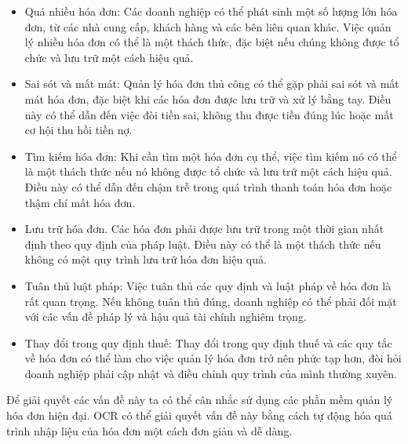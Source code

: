 \begin{itemize}
    \item Quá nhiều hóa đơn: Các doanh nghiệp có thể phát sinh một số lượng lớn hóa đơn, từ các nhà cung cấp, khách hàng và các bên liên quan khác. Việc quản lý nhiều hóa đơn có thể là một thách thức, đặc biệt nếu chúng không được tổ chức và lưu trữ một cách hiệu quả.
    \item Sai sót và mất mát: Quản lý hóa đơn thủ công có thể gặp phải sai sót và mất mát hóa đơn, đặc biệt khi các hóa đơn được lưu trữ và xử lý bằng tay. Điều này có thể dẫn đến việc đòi tiền sai, không thu được tiền đúng lúc hoặc mất cơ hội thu hồi tiền nợ. 
    \item Tìm kiếm hóa đơn: Khi cần tìm một hóa đơn cụ thể, việc tìm kiếm nó có thể là một thách thức nếu nó không được tổ chức và lưu trữ một cách hiệu quả. Điều này có thể dẫn đến chậm trễ trong quá trình thanh toán hóa đơn hoặc thậm chí mất hóa đơn.
    \item Lưu trữ hóa đơn. Các hóa đơn phải được lưu trữ trong một thời gian nhất định theo quy định của pháp luật. Điều này có thể là một thách thức nếu không có một quy trình lưu trữ hóa đơn hiệu quả.
    \item Tuân thủ luật pháp: Việc tuân thủ các quy định và luật pháp về hóa đơn là rất quan trọng. Nếu không tuân thủ đúng, doanh nghiệp có thể phải đối mặt với các vấn đề pháp lý và hậu quả tài chính nghiêm trọng.
    \item Thay đổi trong quy định thuế: Thay đổi trong quy định thuế và các quy tắc về hóa đơn có thể làm cho việc quản lý hóa đơn trở nên phức tạp hơn, đòi hỏi doanh nghiệp phải cập nhật và điều chỉnh quy trình của mình thường xuyên.
\end{itemize}

\indent Để giải quyết các vấn đề này ta có thể cân nhắc sử dụng các phần mềm quản lý hóa đơn hiện đại. OCR có thể giải quyết vấn đề này bằng cách tự động hóa quá trình nhập liệu của hóa đơn một cách đơn giản và dễ dàng.


